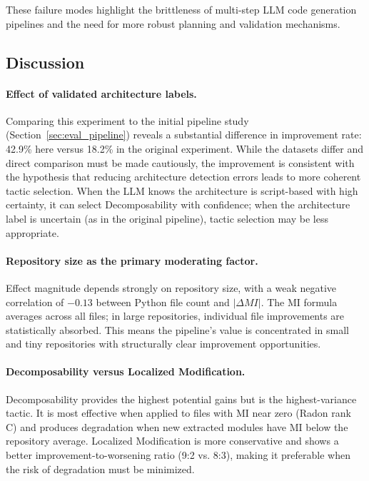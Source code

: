 \documentclass[sigconf,review,anonymous]{acmart}
\begin{document}
These failure modes highlight the brittleness of multi-step LLM code generation pipelines and the need for more robust planning and validation mechanisms.

\subsection{Discussion}

\paragraph{Effect of validated architecture labels.} Comparing this experiment to the initial pipeline study (Section~\ref{sec:eval_pipeline}) reveals a substantial difference in improvement rate: 42.9\% here versus 18.2\% in the original experiment. While the datasets differ and direct comparison must be made cautiously, the improvement is consistent with the hypothesis that reducing architecture detection errors leads to more coherent tactic selection. When the LLM knows the architecture is script-based with high certainty, it can select Decomposability with confidence; when the architecture label is uncertain (as in the original pipeline), tactic selection may be less appropriate.

\paragraph{Repository size as the primary moderating factor.} Effect magnitude depends strongly on repository size, with a weak negative correlation of $-0.13$ between Python file count and $|\Delta MI|$. The MI formula averages across all files; in large repositories, individual file improvements are statistically absorbed. This means the pipeline's value is concentrated in small and tiny repositories with structurally clear improvement opportunities.

\paragraph{Decomposability versus Localized Modification.} Decomposability provides the highest potential gains but is the highest-variance tactic. It is most effective when applied to files with MI near zero (Radon rank C) and produces degradation when new extracted modules have MI below the repository average. Localized Modification is more conservative and shows a better improvement-to-worsening ratio (9:2 vs. 8:3), making it preferable when the risk of degradation must be minimized.
\end{document}
